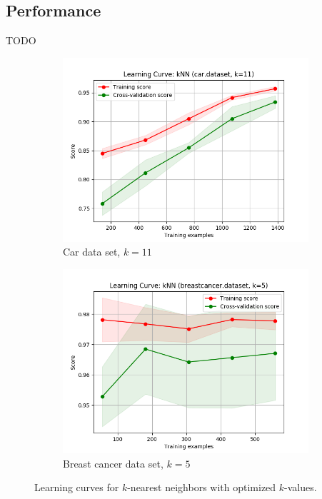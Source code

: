 \documentclass{article}
\begin{document}
    \subsection{Performance}

    TODO 

    \begin{figure}[htb]
    \centering

    \begin{subfigure}{0.5\textwidth}
      \includegraphics[width=\linewidth]{out/knn/car-k-11.png}
      \caption{Car data set, $k=11$}
      \label{fig:knn-learning-1}
    \end{subfigure}\hfil
    \begin{subfigure}{0.5\textwidth}
      \includegraphics[width=\linewidth]{out/knn/breastcancer-k-5.png}
      \caption{Breast cancer data set, $k=5$}
      \label{fig:knn-learning-2}
    \end{subfigure}

    \caption{Learning curves for $k$-nearest neighbors with optimized $k$-values.}
    \label{fig:knn-learning}
    \end{figure}
\end{document}
